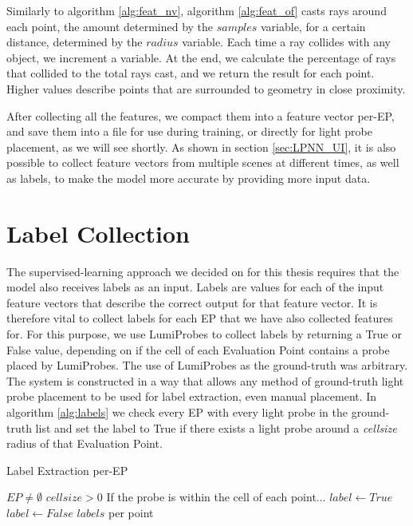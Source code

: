 Similarly to algorithm \ref{alg:feat_nv}, algorithm \ref{alg:feat_of} casts rays around each point, the amount determined by the $samples$ variable, for a certain distance, determined by the $radius$ variable. Each time a ray collides with any object, we increment a variable. At the end, we calculate the percentage of rays that collided to the total rays cast, and we return the result for each point. Higher values describe points that are surrounded to geometry in close proximity.

After collecting all the features, we compact them into a feature vector per-EP, and save them into a file for use during training, or directly for light probe placement, as we will see shortly. As shown in section \ref{sec:LPNN_UI}, it is also possible to collect feature vectors from multiple scenes at different times, as well as labels, to make the model more accurate by providing more input data. 

\section{Label Collection}

The supervised-learning approach we decided on for this thesis requires that the model also receives labels as an input. Labels are values for each of the input feature vectors that describe the correct output for that feature vector. It is therefore vital to collect labels for each EP that we have also collected features for. For this purpose, we use LumiProbes \parencite{Vardis2021} to collect labels by returning a True or False value, depending on if the cell of each Evaluation Point contains a probe placed by LumiProbes. The use of LumiProbes as the ground-truth was arbitrary. The system is constructed in a way that allows any method of ground-truth light probe placement to be used for label extraction, even manual placement. In algorithm \ref{alg:labels} we check every EP with every light probe in the ground-truth list and set the label to True if there exists a light probe around a \textit{cellsize} radius of that Evaluation Point.

\begin{algorithm}
	\caption{Label Extraction per-EP}
	\label{alg:labels}
	\begin{algorithmic}[1]
		\Require $EP \neq \emptyset$
		\Require $cellsize > 0$
				\Comment If the probe is within the cell of each point...
					\State $label \gets True$
				\Else
					\State $label \gets False$
				\EndIf
			\EndFor
		\EndFor
		\State \Return $labels$ per point
	\end{algorithmic}
\end{algorithm}

